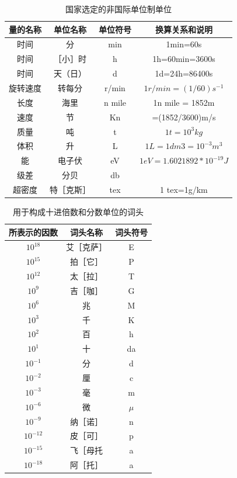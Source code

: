 \begin{table}
	\centering
	\song\wuhao
	\caption{国家选定的非国际单位制单位}
	\begin{tabular}{cccc}
	\hline
	量的名称&单位名称&单位符号&换算关系和说明\\
	\hline
	时间&分&min&1min=60s\\
	时间&［小］时&h&1h=60min=3600s\\
	时间&天（日）&d&1d=24h=86400s\\
	旋转速度&转每分&r/min&$1r/min=(1/60)s^{-1}$\\
	长度&海里&n mile&1n mile = 1852m\\
	速度&节&Kn&=(1852/3600)m/s\\
	质量&吨&t&$1t=10^3kg$\\
	体积&升&L&$1L=1dm3=10^{-3}m^3$\\
	能&电子伏&eV&$1eV=1.6021892*10^{-19}J$\\
	级差&分贝&db&~\\
	超密度&特［克斯］&tex&1 tex=1g/km\\
	\hline
	\end{tabular}
\end{table}

\begin{table}
	\centering
	\song\wuhao
	\caption{用于构成十进倍数和分数单位的词头}
	\begin{tabular}{ccc}
	\hline
	所表示的因数&词头名称&词头符号\\
	\hline
	$10^{18}$&艾［克萨］&E\\
	$10^{15}$&拍［它］&P\\
	$10^{12}$&太［拉］&T\\
	$10^{9}$&吉［咖］&G\\
	$10^{6}$&兆&M\\
	$10^{3}$&千&K\\
	$10^{2}$&百&h\\
	$10^{1}$&十&da\\
	$10^{-1}$&分&d\\
	$10^{-2}$&厘&c\\
	$10^{-3}$&毫&m\\
	$10^{-6}$&微&$\mu$\\
	$10^{-9}$&纳［诺］&n\\
	$10^{-12}$&皮［可］&p\\
	$10^{-15}$&飞［母托&a\\
	$10^{-18}$&阿［托］&a\\
	\hline
	\end{tabular}
\end{table}

